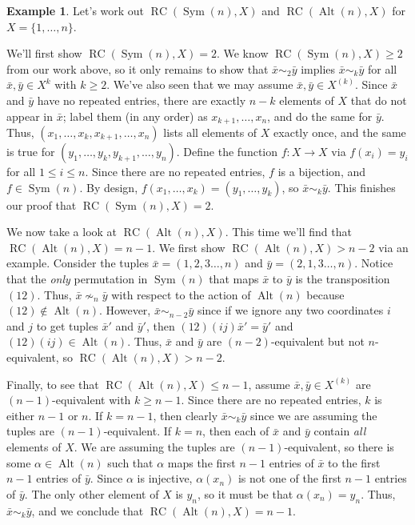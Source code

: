 \documentclass[11pt]{amsart}
\theoremstyle{plain}
\theoremstyle{definition}
\newtheorem{example}{Example}
\theoremstyle{remark}
\DeclareMathOperator{\Sym}{Sym}
\DeclareMathOperator{\Alt}{Alt}
\DeclareMathOperator{\rc}{RC}
\begin{document}
\begin{example}\label{exam.SymAltRC}
Let's work out $\rc(\Sym(n),X)$ and $\rc(\Alt(n),X)$ for $X = \{1,\ldots,n\}$.

We'll first show  $\rc(\Sym(n),X)=2$. We know $\rc(\Sym(n),X)\ge 2$ from our work above, so it only remains to show that $\bar{x}\sim_2\bar{y}$ implies $\bar{x}\sim_k\bar{y}$ for  all $\bar{x},\bar{y} \in X^k$ with $k\ge 2$. We've also seen that we may assume $\bar{x},\bar{y} \in X^{(k)}$. Since $\bar{x}$ and $\bar{y}$ have no repeated entries,  there are exactly $n-k$ elements of $X$ that do not appear in $\bar{x}$; label them (in any order) as $x_{k+1},\ldots,x_{n}$, and do the same for $\bar{y}$. Thus, $(x_1,\ldots,x_{k},x_{k+1},\ldots,x_{n})$ lists all elements of $X$ exactly once, and the same is true for $(y_1,\ldots,y_{k},y_{k+1},\ldots,y_{n})$. Define the function $f:X\rightarrow X$ via $f(x_i) = y_i$ for all $1\le i \le n$. Since there are no repeated entries, $f$ is a bijection, and $f\in \Sym(n)$. By design, $f(x_1,\ldots,x_{k}) = (y_1,\ldots,y_{k})$, so $\bar{x}\sim_k\bar{y}$. This finishes our proof that $\rc(\Sym(n),X)=2$.

We now take a look at $\rc(\Alt(n),X)$. This time we'll find that $\rc(\Alt(n),X)= n-1$. We first show $\rc(\Alt(n),X)> n-2$ via an example. Consider the tuples $\bar{x} = (1,2,3\ldots, n)$ and $\bar{y} = (2,1,3\ldots,n)$. Notice that the \emph{only} permutation in $\Sym(n)$ that maps $\bar{x}$ to $\bar{y}$ is the transposition $(12)$. Thus, $\bar{x}\nsim_n\bar{y}$ with respect to the action of $\Alt(n)$ because $(12) \notin \Alt(n)$. However, $\bar{x}\sim_{n-2}\bar{y}$ since if we ignore any two coordinates $i$ and $j$ to get tuples $\bar{x}'$ and $\bar{y}'$, then  $(12)(ij)\bar{x}'=\bar{y}'$ and $(12)(ij) \in \Alt(n)$. Thus, $\bar{x}$ and $\bar{y}$ are $(n-2)$-equivalent but not $n$-equivalent, so $\rc(\Alt(n),X)> n-2$. 

Finally, to see that $\rc(\Alt(n),X)\le n-1$, assume $\bar{x},\bar{y} \in X^{(k)}$ are $(n-1)$-equivalent with $k\ge n-1$. Since there are no repeated entries, $k$ is either $n-1$ or $n$. If $k=n-1$, then clearly   $\bar{x}\sim_k\bar{y}$ since we are assuming the tuples are $(n-1)$-equivalent. If $k=n$, then each of $\bar{x}$ and $\bar{y}$ contain \emph{all} elements of $X$. We are assuming the tuples are $(n-1)$-equivalent, so there is some $\alpha\in \Alt(n)$ such that $\alpha$ maps the first $n-1$ entries of $\bar{x}$ to the first $n-1$ entries of $\bar{y}$. Since $\alpha$ is injective, $\alpha(x_n)$ is not one of the first $n-1$ entries of $\bar{y}$. The only other element of $X$ is $y_n$, so it must be that $\alpha(x_n)=y_n$. Thus, $\bar{x}\sim_k\bar{y}$, and we conclude that $\rc(\Alt(n),X)= n-1$.
\end{example}
\end{document}

